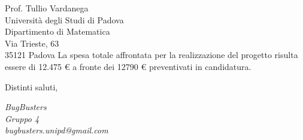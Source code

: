 \documentclass[a4paper,11pt]{letter}
\makeatletter
\newcommand{\GruppoFirma}{BugBusters\\Gruppo 4\\bugbusters.unipd@gmail.com}
\makeatother
\begin{document}
\begin{letter}{Prof. Tullio Vardanega\\Universit\`a degli Studi di Padova\\Dipartimento di Matematica\\Via Trieste, 63\\35121 Padova}
\vspace{0.8em}
La spesa totale affrontata per la realizzazione del progetto risulta essere di 12.475 € a fronte dei 12790 € preventivati in candidatura.

\closing{Distinti saluti,}

\vspace{-4em} %

\begin{flushleft}
    \textit{\GruppoFirma}
\end{flushleft}

\end{letter}
\end{document}
